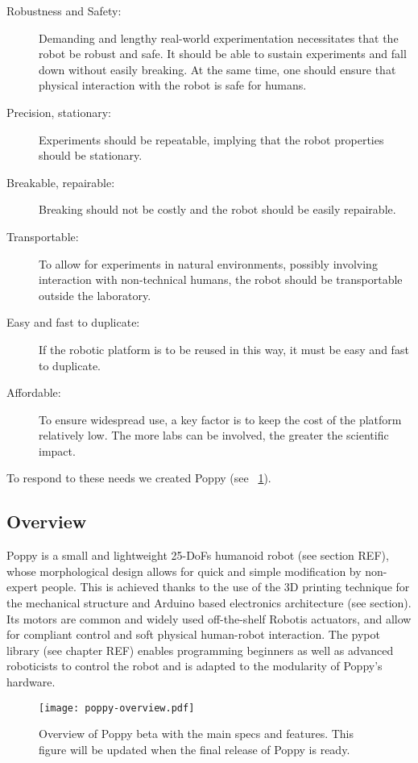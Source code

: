 \begin{description}
    \item[Robustness and Safety:] Demanding and lengthy real-world experimentation necessitates that the robot be robust and safe. It should be able to sustain experiments and fall down without easily breaking. At the same time, one should ensure that physical interaction with the robot is safe for humans.
    \item [Precision, stationary:]Experiments should be repeatable, implying that the robot properties should be stationary.
    \item [Breakable, repairable:] Breaking should not be costly and the robot should be easily repairable.
    \item [Transportable:] To allow for experiments in natural environments, possibly involving interaction with non-technical humans, the robot should be transportable outside the laboratory.
    \item [Easy and fast to duplicate:]If the robotic platform is to be reused  in this way, it must be easy and fast to duplicate.
    \item [Affordable:] To ensure widespread use, a key factor is to keep the cost of the platform relatively low. The more labs can be involved, the greater the scientific impact.
\end{description}

To respond to these needs we created Poppy (see \figurename~\ref{fig:poppyv0.1_overview}).

\subsection{Overview} %

Poppy is a small and lightweight 25-DoFs humanoid robot (see section REF), whose morphological design allows for quick and simple modification by non-expert people. This is achieved thanks to the use of the 3D printing technique for the mechanical structure and Arduino based electronics architecture (see section). Its motors are common and widely used off-the-shelf Robotis actuators, and allow for compliant control and soft physical human-robot interaction. The pypot library (see chapter REF) enables programming beginners as well as advanced roboticists to control the robot and is adapted to the modularity of Poppy’s hardware.

\begin{figure}[tb]
    \begin{center}
        \texttt{[image: poppy-overview.pdf]}
    \end{center}
    \caption{Overview of Poppy beta with the main specs and features. This figure will be updated when the final release of Poppy is ready.}
    \label{fig:poppyv0.1_overview}
\end{figure}

